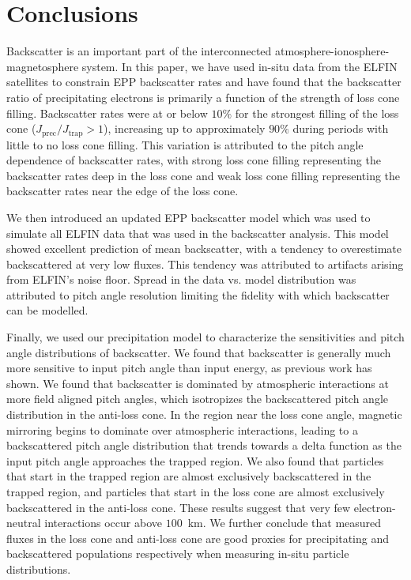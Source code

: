 \documentclass[draft]{agujournal2019}
\begin{document}
\section{Conclusions}
Backscatter is an important part of the interconnected atmosphere-ionosphere-magnetosphere system. In this paper, we have used in-situ data from the ELFIN satellites to constrain EPP backscatter rates and have found that the backscatter ratio of precipitating electrons is primarily a function of the strength of loss cone filling. Backscatter rates were at or below $10\%$ for the strongest filling of the loss cone ($J_\text{prec}/J_\text{trap} > 1$), increasing up to approximately $90\%$ during periods with little to no loss cone filling. This variation is attributed to the pitch angle dependence of backscatter rates, with strong loss cone filling representing the backscatter rates deep in the loss cone and weak loss cone filling representing the backscatter rates near the edge of the loss cone.

We then introduced an updated EPP backscatter model which was used to simulate all ELFIN data that was used in the backscatter analysis. This model showed excellent prediction of mean backscatter, with a tendency to overestimate backscattered at very low fluxes. This tendency was attributed to artifacts arising from ELFIN's noise floor. Spread in the data vs. model distribution was attributed to pitch angle resolution limiting the fidelity with which backscatter can be modelled.

Finally, we used our precipitation model to characterize the sensitivities and pitch angle distributions of backscatter. We found that backscatter is generally much more sensitive to input pitch angle than input energy, as previous work has shown. We found that backscatter is dominated by atmospheric interactions at more field aligned pitch angles, which isotropizes the backscattered pitch angle distribution in the anti-loss cone. In the region near the loss cone angle, magnetic mirroring begins to dominate over atmospheric interactions, leading to a backscattered pitch angle distribution that trends towards a delta function as the input pitch angle approaches the trapped region. We also found that particles that start in the trapped region are almost exclusively backscattered in the trapped region, and particles that start in the loss cone are almost exclusively backscattered in the anti-loss cone. These results suggest that very few electron-neutral interactions occur above $100$~km. We further conclude that measured fluxes in the loss cone and anti-loss cone are good proxies for precipitating and backscattered populations respectively when measuring in-situ particle distributions.
\end{document}

